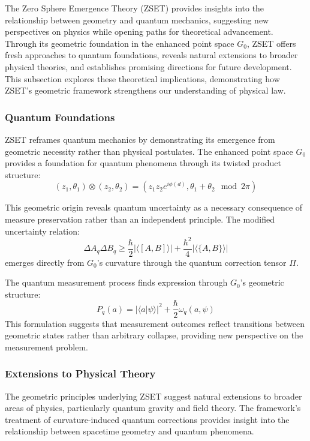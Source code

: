 \documentclass[10pt]{article}
\begin{document}
The Zero Sphere Emergence Theory (ZSET) provides insights into the relationship between geometry and quantum mechanics, suggesting new perspectives on physics while opening paths for theoretical advancement. Through its geometric foundation in the enhanced point space \(G_0\), ZSET offers fresh approaches to quantum foundations, reveals natural extensions to broader physical theories, and establishes promising directions for future development. This subsection explores these theoretical implications, demonstrating how ZSET's geometric framework strengthens our understanding of physical law.

\subsubsection{Quantum Foundations}

ZSET reframes quantum mechanics by demonstrating its emergence from geometric necessity rather than physical postulates. The enhanced point space \(G_0\) provides a foundation for quantum phenomena through its twisted product structure:
\[
(z_1, \theta_1) \otimes (z_2, \theta_2) = \left(z_1 z_2 e^{i\phi(d)}, \theta_1 + \theta_2 \mod 2\pi\right)
\]

This geometric origin reveals quantum uncertainty as a necessary consequence of measure preservation rather than an independent principle. The modified uncertainty relation:
\[
\Delta A_q \Delta B_q \geq \frac{\hbar}{2}|\langle [A, B] \rangle| + \frac{\hbar^2}{4}|\langle \{A, B\} \rangle|
\]
emerges directly from \(G_0\)'s curvature through the quantum correction tensor \(\Pi\).

The quantum measurement process finds expression through \(G_0\)'s geometric structure:
\[
P_q(a) = |\langle a | \psi \rangle|^2 + \frac{\hbar}{2} \omega_q(a, \psi)
\]
This formulation suggests that measurement outcomes reflect transitions between geometric states rather than arbitrary collapse, providing new perspective on the measurement problem.

\subsubsection{Extensions to Physical Theory}

The geometric principles underlying ZSET suggest natural extensions to broader areas of physics, particularly quantum gravity and field theory. The framework's treatment of curvature-induced quantum corrections provides insight into the relationship between spacetime geometry and quantum phenomena.
\end{document}
